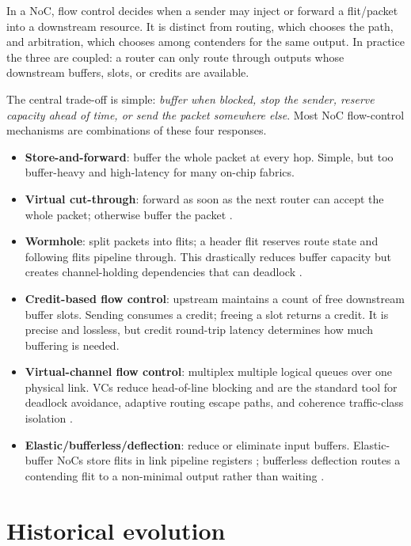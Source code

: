 \documentclass[11pt]{article}
\newcommand{\term}[1]{\textbf{#1}}
\newcommand{\flow}{flow control}
\begin{document}
In a NoC, \flow{} decides when a sender may inject or forward a flit/packet into a downstream resource. It is distinct from routing, which chooses the path, and arbitration, which chooses among contenders for the same output. In practice the three are coupled: a router can only route through outputs whose downstream buffers, slots, or credits are available.

The central trade-off is simple: \emph{buffer when blocked, stop the sender, reserve capacity ahead of time, or send the packet somewhere else}. Most NoC flow-control mechanisms are combinations of these four responses.

\begin{itemize}
  \item \term{Store-and-forward}: buffer the whole packet at every hop. Simple, but too buffer-heavy and high-latency for many on-chip fabrics.
  \item \term{Virtual cut-through}: forward as soon as the next router can accept the whole packet; otherwise buffer the packet \cite{Kermani1979VirtualCutThrough}.
  \item \term{Wormhole}: split packets into flits; a header flit reserves route state and following flits pipeline through. This drastically reduces buffer capacity but creates channel-holding dependencies that can deadlock \cite{NiMcKinley1993,DallyTowles2004Book}.
  \item \term{Credit-based flow control}: upstream maintains a count of free downstream buffer slots. Sending consumes a credit; freeing a slot returns a credit. It is precise and lossless, but credit round-trip latency determines how much buffering is needed.
  \item \term{Virtual-channel flow control}: multiplex multiple logical queues over one physical link. VCs reduce head-of-line blocking and are the standard tool for deadlock avoidance, adaptive routing escape paths, and coherence traffic-class isolation \cite{Dally1990VC,Dally1992VC}.
  \item \term{Elastic/bufferless/deflection}: reduce or eliminate input buffers. Elastic-buffer NoCs store flits in link pipeline registers \cite{Michelogiannakis2009Elastic}; bufferless deflection routes a contending flit to a non-minimal output rather than waiting \cite{Moscibroda2009,Fallin2011CHIPPER}.
\end{itemize}

\section{Historical evolution}
\end{document}
